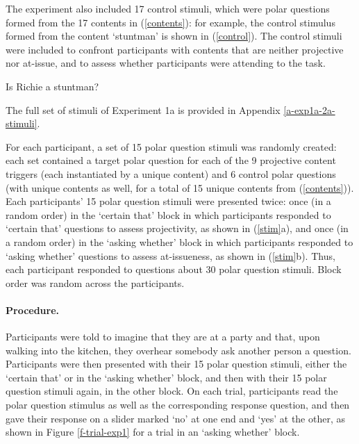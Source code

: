 \documentclass[11pt,fleqn]{article}
\newcommand{\6}{\mbox{$[\hspace*{-.6mm}[$}}
\newcommand{\9}{\mbox{$]\hspace*{-.6mm}]$}}
\begin{document}
The experiment also included 17 control stimuli, which were polar questions formed from the 17 contents in (\ref{contents}): for example, the control stimulus formed from the content `stuntman' is shown in (\ref{control}). The control stimuli were included to confront participants with contents that are neither projective nor at-issue, and to assess whether participants were attending to the task. 

\begin{exe}
\ex\label{control} Is Richie a stuntman?
\end{exe}
The full set of stimuli of Experiment 1a is provided in Appendix \ref{a-exp1a-2a-stimuli}.

For each participant, a set of 15 polar question stimuli was randomly created: each set contained a target polar question for each of the 9 projective content triggers (each  instantiated by a unique content) and 6 control polar questions (with unique contents as well, for a total of 15 unique contents from (\ref{contents})). Each participants' 15 polar question stimuli were presented twice: once (in a random order) in the `certain that' block in which participants responded to `certain that' questions to assess projectivity, as shown in (\ref{stim}a), and once (in a random order) in the `asking whether' block in which participants responded to `asking whether' questions to assess at-issueness, as shown in (\ref{stim}b). Thus, each participant responded to questions about 30 polar question stimuli. Block order was random across the participants.


\paragraph{Procedure.} Participants were told to imagine that they are at a party and that, upon walking into the kitchen, they overhear somebody ask another person a question. Participants were then presented with their 15 polar question stimuli, either the `certain that' or in the `asking whether' block, and then with their 15 polar question stimuli again, in the other block. On each trial, participants read the polar question stimulus as well as the corresponding response question, and then gave their response on a slider marked `no' at one end and `yes' at the other, as shown in Figure \ref{f-trial-exp1} for a trial in an `asking whether' block.  
\end{document}
